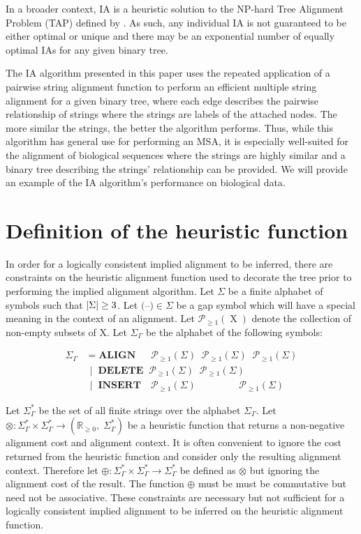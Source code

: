 \documentclass[11pt]{article}
\newcommand*\NEPowerset{\mathcal{P}_{\geq 1}}
\newcommand*\gap{\textrm{(--)}}
\newcommand*\NonNegReals{\mathbb{R}_{\geq 0}}
\DeclarePairedDelimiter\setsize{\lvert}{\rvert}%
\begin{document}
In a broader context, IA is a heuristic solution to the NP-hard Tree Alignment Problem (TAP) defined by \cite{sankoff1975}.
As such, any individual IA is not guaranteed to be either optimal or unique and there may be an exponential number of equally optimal IAs for any given binary tree.

The IA algorithm presented in this paper uses the repeated application of a pairwise string alignment function to perform an efficient multiple string alignment for a given binary tree, where each edge describes the pairwise relationship of strings where the strings are labels of the attached nodes.
The more similar the strings, the better the algorithm performs.
Thus, while this algorithm has general use for performing an MSA, it is especially well-suited for the alignment of biological sequences where the strings are highly similar and a binary tree describing the strings' relationship can be provided. 
We will provide an example of the IA algorithm's performance on biological data.


\section{Definition of the heuristic function}
In order for a logically consistent implied alignment to be inferred, there are constraints on the heuristic alignment function used to decorate the tree prior to performing the implied alignment algorithm.
Let $\Sigma$ be a finite alphabet of symbols such that $\setsize{\Sigma} \geq 3$.
Let $\gap \in \Sigma$ be a gap symbol which will have a special meaning in the context of an alignment.
Let $\NEPowerset (\operatorname{X})$ denote the collection of non-empty subsets of $\mathrm{X}$.
Let $\Sigma_{\Gamma}$ be the alphabet of the following symbols:

\begin{align*}
  \Sigma_{\Gamma} &      = \textbf{ALIGN}  \;\;\;\;\;\,  \NEPowerset (\Sigma) \;\; \NEPowerset (\Sigma) \;\; \NEPowerset (\Sigma)
\\                & \;\, | \;\; \textbf{DELETE} \;\;     \NEPowerset (\Sigma) \;\; \NEPowerset (\Sigma)
\\                & \;\, | \;\; \textbf{INSERT} \;\;\;\, \NEPowerset (\Sigma) \;\; \quad\quad\quad\;         \;\; \NEPowerset (\Sigma)
\end{align*}

Let $\Sigma^{*}_{\Gamma}$ be the set of all finite strings over the alphabet $\Sigma_{\Gamma}$.
Let $\otimes : \Sigma^{*}_{\Gamma} \times \Sigma^{*}_{\Gamma} \rightarrow \left(\NonNegReals,\; \Sigma^{*}_{\Gamma}\right)$ be a heuristic function that returns a non-negative alignment cost and alignment context.
It is often convenient to ignore the cost returned from the heuristic function and consider only the resulting alignment context.
Therefore let $\oplus : \Sigma^{*}_{\Gamma} \times \Sigma^{*}_{\Gamma} \rightarrow \Sigma^{*}_{\Gamma}$ be defined as $\otimes$ but ignoring the alignment cost of the result.
The function $\oplus$ must be must be commutative but need not be associative.
These constraints are necessary but not sufficient for a logically consistent implied alignment to be inferred on the heuristic alignment function.
\end{document}
